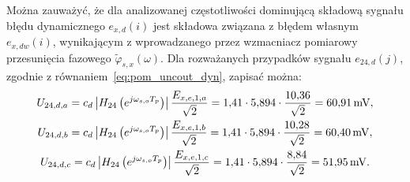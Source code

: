 Można zauważyć, że dla analizowanej częstotliwości dominującą składową sygnału błędu dynamicznego $e_{x,d}(i)$ jest składowa związana z błędem własnym $e_{x,dw}(i)$, wynikającym z wprowadzanego przez wzmacniacz pomiarowy przesunięcia fazowego $\tilde{\varphi}_{s,x}(\omega)$. Dla rozważanych przypadków sygnału $e_{24,d}(j)$, zgodnie z równaniem~\eqref{eq:pom_uncout_dyn}, zapisać można:
\begin{gather}
U_{24,d,a} = c_{d} \left| H_{24} \left(e^{j \omega_{s,o} T_{p}}\right) \right| \frac{E_{x,e,1,a}}{\sqrt{2}} = \num{1.41} \cdot \num{5.894} \cdot \frac{\num{10.36}}{\sqrt{2}} = \qty{60.91}{mV} \label{eq:pom_mono_dyn_unc_a}, \\
U_{24,d,b} = c_{d} \left| H_{24} \left(e^{j \omega_{s,o} T_{p}}\right) \right| \frac{E_{x,e,1,b}}{\sqrt{2}} = \num{1.41} \cdot \num{5.894} \cdot \frac{\num{10.28}}{\sqrt{2}} = \qty{60.40}{mV} \label{eq:pom_mono_dyn_unc_b}, \\
U_{24,d,c} = c_{d} \left| H_{24} \left(e^{j \omega_{s,o} T_{p}}\right) \right| \frac{E_{x,e,1,c}}{\sqrt{2}} = \num{1.41} \cdot \num{5.894} \cdot \frac{\num{8.84}}{\sqrt{2}} = \qty{51.95}{mV} \label{eq:pom_mono_dyn_unc_c}.
\end{gather}

